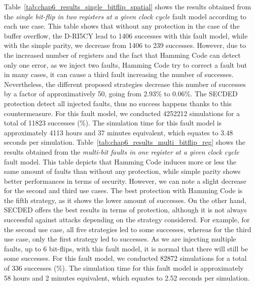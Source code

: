 Table~\ref{tab:chap6_results_single_bitflip_spatial} shows the results obtained from the \textit{single bit-flip in two registers at a given clock cycle} fault model according to each use case. This table shows that without any protection in the case of the buffer overflow, the D-RI5CY lead to 1406 successes with this fault model, while with the simple parity, we decrease from 1406 to 239 successes. However, due to the increased number of registers and the fact that Hamming Code can detect only one error, as we inject two faults, Hamming Code try to correct a fault but in many cases, it can cause a third fault increasing the number of successes. Nevertheless, the different proposed strategies decrease this number of successes by a factor of approximatively 50, going from 2.93\% to 0.06\%. The SECDED protection detect all injected faults, thus no success happens thanks to this countermeasure. For this fault model, we conducted \num{4252212} simulations for a total of \num{11823} successes (\%). The simulation time for this fault model is approximately 4113 hours and 37 minutes equivalent, which equates to 3.48 seconds per simulation.
Table~\ref{tab:chap6_results_multi_bitflip_reg} shows the results obtained from the \textit{multi-bit faults in one register at a given clock cycle} fault model. This table depicts that Hamming Code induces more or less the same amount of faults than without any protection, while simple parity shows better performances in terms of security. However, we can note a slight decrease for the second and third use cases. The best protection with Hamming Code is the fifth strategy, as it shows the lower amount of successes. On the other hand, SECDED offers the best results in terms of protection, although it is not always successful against attacks depending on the strategy considered. For example, for the second use case, all five strategies led to some successes, whereas for the third use case, only the first strategy led to successes. As we are injecting multiple faults, up to 6 bit-flips, with this fault model, it is normal that there will still be some successes. For this fault model, we conducted \num{82872} simulations for a total of \num{336} successes (\%). The simulation time for this fault model is approximately 58 hours and 2 minutes equivalent, which equates to 2.52 seconds per simulation.
